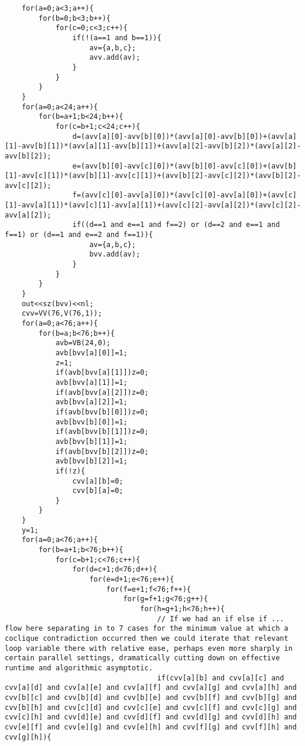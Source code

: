 \begin{verbatim}
	for(a=0;a<3;a++){
		for(b=0;b<3;b++){
			for(c=0;c<3;c++){
				if(!(a==1 and b==1)){
					av={a,b,c};
					avv.add(av);
				}
			}
		}
	}
	for(a=0;a<24;a++){
		for(b=a+1;b<24;b++){
			for(c=b+1;c<24;c++){
				d=(avv[a][0]-avv[b][0])*(avv[a][0]-avv[b][0])+(avv[a][1]-avv[b][1])*(avv[a][1]-avv[b][1])+(avv[a][2]-avv[b][2])*(avv[a][2]-avv[b][2]);
				e=(avv[b][0]-avv[c][0])*(avv[b][0]-avv[c][0])+(avv[b][1]-avv[c][1])*(avv[b][1]-avv[c][1])+(avv[b][2]-avv[c][2])*(avv[b][2]-avv[c][2]);
				f=(avv[c][0]-avv[a][0])*(avv[c][0]-avv[a][0])+(avv[c][1]-avv[a][1])*(avv[c][1]-avv[a][1])+(avv[c][2]-avv[a][2])*(avv[c][2]-avv[a][2]);
				if((d==1 and e==1 and f==2) or (d==2 and e==1 and f==1) or (d==1 and e==2 and f==1)){
					av={a,b,c};
					bvv.add(av);
				}
			}
		}
	}
	out<<sz(bvv)<<nl;
	cvv=VV(76,V(76,1));
	for(a=0;a<76;a++){
		for(b=a;b<76;b++){
			avb=VB(24,0);
			avb[bvv[a][0]]=1;
			z=1;
			if(avb[bvv[a][1]])z=0;
			avb[bvv[a][1]]=1;
			if(avb[bvv[a][2]])z=0;
			avb[bvv[a][2]]=1;
			if(avb[bvv[b][0]])z=0;
			avb[bvv[b][0]]=1;
			if(avb[bvv[b][1]])z=0;
			avb[bvv[b][1]]=1;
			if(avb[bvv[b][2]])z=0;
			avb[bvv[b][2]]=1;
			if(!z){
				cvv[a][b]=0;
				cvv[b][a]=0;
			}
		}
	}
	y=1;
	for(a=0;a<76;a++){
		for(b=a+1;b<76;b++){
			for(c=b+1;c<76;c++){
				for(d=c+1;d<76;d++){
					for(e=d+1;e<76;e++){
						for(f=e+1;f<76;f++){
							for(g=f+1;g<76;g++){
								for(h=g+1;h<76;h++){
									// If we had an if else if ... flow here separating in to 7 cases for the minimum value at which a coclique contradiction occurred then we could iterate that relevant loop variable there with relative ease, perhaps even more sharply in certain parallel settings, dramatically cutting down on effective runtime and algorithmic asymptotic.
									if(cvv[a][b] and cvv[a][c] and cvv[a][d] and cvv[a][e] and cvv[a][f] and cvv[a][g] and cvv[a][h] and cvv[b][c] and cvv[b][d] and cvv[b][e] and cvv[b][f] and cvv[b][g] and cvv[b][h] and cvv[c][d] and cvv[c][e] and cvv[c][f] and cvv[c][g] and cvv[c][h] and cvv[d][e] and cvv[d][f] and cvv[d][g] and cvv[d][h] and cvv[e][f] and cvv[e][g] and cvv[e][h] and cvv[f][g] and cvv[f][h] and cvv[g][h]){

\end{verbatim}
